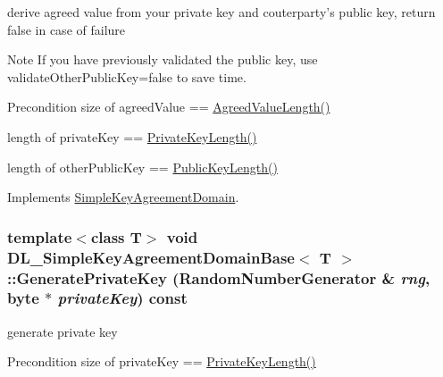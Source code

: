 derive agreed value from your private key and couterparty's public key, return false in case of failure \begin{DoxyNote}{Note}
If you have previously validated the public key, use validateOtherPublicKey=false to save time. 
\end{DoxyNote}
\begin{DoxyPrecond}{Precondition}
size of agreedValue == \hyperlink{class_d_l___simple_key_agreement_domain_base_a3c106455bfa82eb09e03686c9ad2771a}{AgreedValueLength()} 

length of privateKey == \hyperlink{class_d_l___simple_key_agreement_domain_base_af91beaef1fe92657a62f53915c6d58c7}{PrivateKeyLength()} 

length of otherPublicKey == \hyperlink{class_d_l___simple_key_agreement_domain_base_aeb0120a4c4170c0c6571e6800d92f2fe}{PublicKeyLength()} 
\end{DoxyPrecond}


Implements \hyperlink{class_simple_key_agreement_domain_a732339ca730408cca7b1191fc32eb39e}{SimpleKeyAgreementDomain}.\hypertarget{class_d_l___simple_key_agreement_domain_base_ad3208753e84fde55582823abdd9922a5}{
\subsubsection[{GeneratePrivateKey}]{\setlength{\rightskip}{0pt plus 5cm}template$<$class T$>$ void {\bf DL\_\-SimpleKeyAgreementDomainBase}$<$ T $>$::GeneratePrivateKey ({\bf RandomNumberGenerator} \& {\em rng}, \/  byte $\ast$ {\em privateKey}) const}}
\label{class_d_l___simple_key_agreement_domain_base_ad3208753e84fde55582823abdd9922a5}


generate private key \begin{DoxyPrecond}{Precondition}
size of privateKey == \hyperlink{class_d_l___simple_key_agreement_domain_base_af91beaef1fe92657a62f53915c6d58c7}{PrivateKeyLength()} 
\end{DoxyPrecond}


